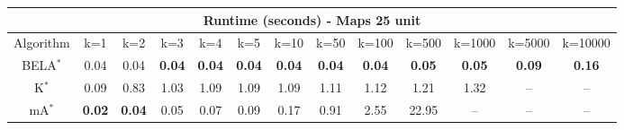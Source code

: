 \begin{tabular}{c|cccccccccccc}\toprule
\multicolumn{13}{c}{Runtime (seconds) - Maps 25 unit}\\ \midrule
Algorithm & k=1 & k=2 & k=3 & k=4 & k=5 & k=10 & k=50 & k=100 & k=500 & k=1000 & k=5000 & k=10000 \\ \midrule
BELA$^*$ & 0.04 & 0.04 & \textbf{0.04} & \textbf{0.04} & \textbf{0.04} & \textbf{0.04} & \textbf{0.04} & \textbf{0.04} & \textbf{0.05} & \textbf{0.05} & \textbf{0.09} & \textbf{0.16} \\
K$^*$ & 0.09 & 0.83 & 1.03 & 1.09 & 1.09 & 1.09 & 1.11 & 1.12 & 1.21 & 1.32 & -- & -- \\
mA$^*$ & \textbf{0.02} & \textbf{0.04} & 0.05 & 0.07 & 0.09 & 0.17 & 0.91 & 2.55 & 22.95 & -- & -- & -- \\ \bottomrule 
\end{tabular}
